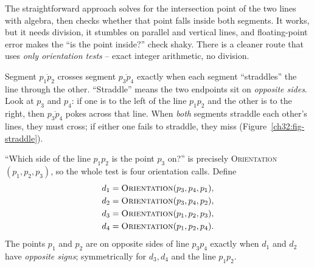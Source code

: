The straightforward approach solves for the intersection point of the two lines with
algebra, then checks whether that point falls inside both segments. It works, but
it needs division, it stumbles on parallel and vertical lines, and floating-point
error makes the ``is the point inside?'' check shaky. There is a cleaner route
that uses \emph{only orientation tests} -- exact integer arithmetic, no division.

\begin{intuitionbox}
Segment $\overline{p_1 p_2}$ crosses segment $\overline{p_3 p_4}$
exactly when each segment ``straddles'' the line through the other. ``Straddle''
means the two endpoints sit on \emph{opposite sides}. Look at $p_3$ and $p_4$: if
one is to the left of the line $p_1 p_2$ and the other is to the right, then
$\overline{p_3 p_4}$ pokes across that line. When \emph{both} segments straddle
each other's lines, they must cross; if either one fails to straddle, they miss (Figure~\ref{ch32:fig-straddle}).
\end{intuitionbox}

``Which side of the line $p_1 p_2$ is the point $p_3$ on?'' is precisely
\textsc{Orientation}$(p_1, p_2, p_3)$, so the whole test is four orientation
calls. Define
\begin{align*}
  d_1 &= \textsc{Orientation}(p_3, p_4, p_1), \\
  d_2 &= \textsc{Orientation}(p_3, p_4, p_2), \\
  d_3 &= \textsc{Orientation}(p_1, p_2, p_3), \\
  d_4 &= \textsc{Orientation}(p_1, p_2, p_4).
\end{align*}
The points $p_1$ and $p_2$ are on opposite sides of line $p_3 p_4$ exactly when
$d_1$ and $d_2$ have \emph{opposite signs}; symmetrically for $d_3, d_4$ and the
line $p_1 p_2$.

